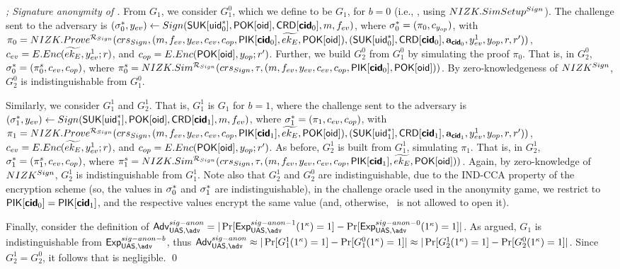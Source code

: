 \begin{proof}[; Signature anonymity of \CUASGen]
  From $G_1$, we consider $G^0_1$, which we define to be $G_1$, for $b=0$
  (i.e., \ExpSigAnonz, using $NIZK.SimSetup^{Sign}$). The challenge sent to the
  adversary is $(\mathsf{\sigma}^*_0,y_{ev}) \gets Sign(\mathsf{S}\mathsf{UK}[\mathsf{uid}^*_0],\mathsf{P}\mathsf{OK}[\mathsf{oid}],
  \mathsf{CRD}[\boldsymbol{\mathsf{cid}}_0],m,f_{ev})$, where $\mathsf{\sigma}^*_0 = (\pi_0,c_{y_{op}})$, with
  $\pi_0 = NIZK.Prove^{\mathcal{R}_{Sign}}(crs_{Sign},(m,f_{ev},y_{ev},
  c_{ev},c_{op},\mathsf{P}\mathsf{IK}[\boldsymbol{\mathsf{cid}}_0],\widetilde{ek_{E}},\mathsf{P}\mathsf{OK}[\mathsf{oid}]),(\mathsf{S}\mathsf{UK}[\mathsf{uid}^*_0],
  \mathsf{CRD}[\boldsymbol{\mathsf{cid}}_0],\mathbf{a}_{\boldsymbol{\mathsf{cid}}_0},y_{ev}^1,y_{op},r,r'))$, $c_{ev} = E.Enc
  (\widetilde{ek_{E}},y_{ev}^1;r)$, and $c_{op} = E.Enc(\mathsf{P}\mathsf{OK}[\mathsf{oid}],y_{op};r')$.
  Further, we build $G_2^0$ from $G_1^0$ by simulating the proof $\pi_0$. That
  is, in $G_2^0$, $\mathsf{\sigma}^*_0 = (\pi_0^s,c_{ev},c_{op})$, where $\pi^s_0 =
  NIZK.Sim^{\mathcal{R}_{Sign}}(crs_{Sign},\tau,(m,f_{ev},y_{ev},
  c_{ev},c_{op},\mathsf{P}\mathsf{IK}[\boldsymbol{\mathsf{cid}}_0],\mathsf{P}\mathsf{OK}[\mathsf{oid}]))$. By zero-knowledgeness
  of $NIZK^{Sign}$, $G_2^0$ is indistinguishable from $G_1^0$.

  Similarly, we consider $G_1^1$ and $G_2^1$. That is, $G_1^1$ is $G_1$
  for $b=1$, where the challenge
  sent to the adversary is $(\mathsf{\sigma}^*_1,y_{ev}) \gets Sign(\mathsf{S}\mathsf{UK}[\mathsf{uid}^*_1],
  \mathsf{P}\mathsf{OK}[\mathsf{oid}],\mathsf{CRD}[\boldsymbol{\mathsf{cid}}_1],m,f_{ev})$, where $\mathsf{\sigma}^*_1 = (\pi_1,c_{ev},
  c_{op})$, with $\pi_1 = NIZK.Prove^{\mathcal{R}_{Sign}}(crs_{Sign},
  (m,f_{ev},y_{ev},c_{ev},c_{op},\mathsf{P}\mathsf{IK}[\boldsymbol{\mathsf{cid}}_1],\widetilde{ek_{E}},
  \mathsf{P}\mathsf{OK}[\mathsf{oid}]),(\mathsf{S}\mathsf{UK}[\mathsf{uid}^*_1],\mathsf{CRD}[\boldsymbol{\mathsf{cid}}_1],\mathbf{a}_{\boldsymbol{\mathsf{cid}}_1},y_{ev}^1,
  y_{op},r,r'))$, $c_{ev} = E.Enc(\widetilde{ek_{E}},y_{ev}^1;r)$, and
  $c_{op} = E.Enc(\mathsf{P}\mathsf{OK}[\mathsf{oid}],y_{op};r')$. As before, $G_2^1$ is built from
  $G_1^1$, simulating $\pi_1$. That is, in $G_2^1$, $\mathsf{\sigma}^*_1 = (\pi_1^s,c_{ev},
  c_{op})$, where $\pi^s_1 = NIZK.Sim^{\mathcal{R}_{Sign}}(crs_{Sign},
  \tau,(m,f_{ev},y_{ev},c_{ev},c_{op},\mathsf{P}\mathsf{IK}[\boldsymbol{\mathsf{cid}}_1],\widetilde{ek_{E}},
  \mathsf{P}\mathsf{OK}[\mathsf{oid}]))$. Again, by zero-knowledge of $NIZK^{Sign}$, $G_2^1$ is
  indistinguishable from $G_1^1$. Note also that $G_2^1$ and $G_2^0$ are
  indistinguishable, due to the IND-CCA property of the encryption scheme
  (so, the \ceval values in $\mathsf{\sigma}^*_0$ and $\mathsf{\sigma}^*_1$ are indistinguishable),
  in the  challenge oracle used in the anonymity game, we restrict to
  $\mathsf{P}\mathsf{IK}[\boldsymbol{\mathsf{cid}}_0] = \mathsf{P}\mathsf{IK}[\boldsymbol{\mathsf{cid}}_1]$, and the respective \cinsp values encrypt
  the same \yinsp value (and, otherwise, \adv~is not allowed to open it).

  Finally, consider the definition of $\AdvSigAnon=|\Pr\lbrack
  \ExpSigAnono(1^\secpar)=1\rbrack-\Pr\lbrack\ExpSigAnonz(1^\secpar)=1\rbrack|$. As
  argued, $G_1$ is indistinguishable from $\ExpSigAnonb$, thus
  $\AdvSigAnon \approx |\Pr\lbrack G_1^1(1^\secpar)=1\rbrack-\Pr\lbrack
  G_1^0(1^\secpar)=1\rbrack| \approx
  |\Pr\lbrack G_2^1(1^\secpar)=1\rbrack-\Pr\lbrack
  G_2^0(1^\secpar)=1\rbrack|$. Since $G_2^1=G_2^0$, it follows that
  \AdvSigAnon is negligible.
  \qed
\end{proof}


